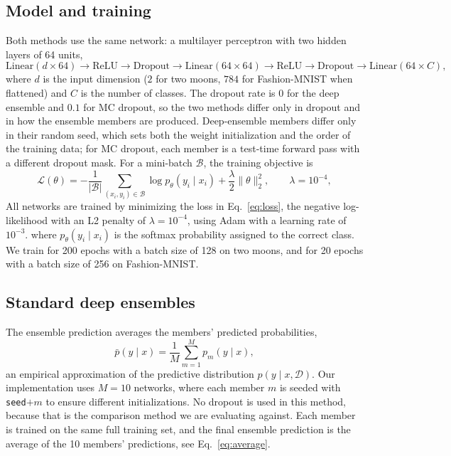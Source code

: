 \documentclass[10pt]{article}
\begin{document}
\subsection{Model and training}

Both methods use the same network: a multilayer perceptron with two hidden layers of 64 units,
\[
  \text{Linear}(d \times 64) \to \text{ReLU} \to \text{Dropout} \to
  \text{Linear}(64 \times 64) \to \text{ReLU} \to \text{Dropout} \to
  \text{Linear}(64 \times C),
\]
where $d$ is the input dimension ($2$ for two moons, $784$ for Fashion-MNIST when flattened) and $C$ is the number of classes.
The dropout rate is $0$ for the deep ensemble and $0.1$ for MC dropout, so the two methods differ only in dropout and in how the ensemble members are produced.
Deep-ensemble members differ only in their random seed, which sets both the weight initialization and the order of the training data; for MC dropout, each member is a test-time forward pass with a different dropout mask.
For a mini-batch $\mathcal{B}$, the training objective is
\begin{equation}
  \mathcal{L}(\theta)
  = -\frac{1}{|\mathcal{B}|}\sum_{(x_i,y_i)\in\mathcal{B}}
      \log p_\theta(y_i\mid x_i)
    + \frac{\lambda}{2}\lVert\theta\rVert_2^2,
  \qquad \lambda=10^{-4},
  \label{eq:loss}
\end{equation}
All networks are trained by minimizing the loss in Eq.~\eqref{eq:loss}, the negative log-likelihood with an L2 penalty of $\lambda = 10^{-4}$, using Adam with a learning rate of $10^{-3}$.
where $p_\theta(y_i\mid x_i)$ is the softmax probability assigned to the correct class.
We train for 200 epochs with a batch size of 128 on two moons, and for 20 epochs with a batch size of 256 on Fashion-MNIST.

\subsection{Standard deep ensembles}

The ensemble prediction averages the members' predicted probabilities,
\begin{equation}
  \bar p(y \mid x) = \frac{1}{M} \sum_{m=1}^{M} p_m(y \mid x),
  \label{eq:average}
\end{equation}
an empirical approximation of the predictive distribution $p(y \mid x, \mathcal D)$.
Our implementation uses $M=10$ networks, where each member $m$ is seeded with \texttt{seed}$+m$ to ensure different initializations. 
No dropout is used in this method, because that is the comparison method we are evaluating against. 
Each member is trained on the same full training set, and the final ensemble prediction is the average of the 10 members' predictions, see Eq.~\eqref{eq:average}.
\end{document}
